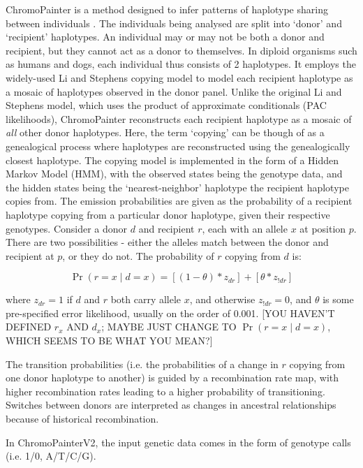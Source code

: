 ChromoPainter is a method designed to infer patterns of haplotype sharing between individuals \cite{Lawson2012}. The individuals being analysed are split into `donor' and `recipient' haplotypes. An individual may or may not be both a donor and recipient, but they cannot act as a donor to themselves. In diploid organisms such as humans and dogs, each individual thus consists of 2 haplotypes. It employs the widely-used Li and Stephens copying model \cite{Li2003} to model each recipient haplotype as a mosaic of haplotypes observed in the donor panel. Unlike the original Li and Stephens model, which uses the product of approximate conditionals (PAC likelihoods), ChromoPainter reconstructs each recipient haplotype as a mosaic of \textit{all} other donor haplotypes. Here, the term `copying' can be though of as a genealogical process where haplotypes are reconstructed using the genealogically closest haplotype. The copying model is implemented in the form of a Hidden Markov Model (HMM), with the observed states being the genotype data, and the hidden states being the `nearest-neighbor' haplotype the recipient haplotype copies from. The emission probabilities are given as the probability of a recipient haplotype copying from a particular donor haplotype, given their respective genotypes. Consider a donor $d$ and recipient $r$, each with an allele $x$ at position $p$. There are two possibilities - either the alleles match between the donor and recipient at $p$, or they do not. The probability of $r$ copying from $d$ is: 

\begin{equation}
\Pr(r = x \mid d = x) = [(1-\theta) * z_{dr}] + [\theta * z_{!dr}] 
\end{equation}

where $z_{dr} = 1$ if $d$ and $r$ both carry allele $x$, and otherwise $z_{!dr} = 0$, and $\theta$ is some pre-specified error likelihood, usually on the order of 0.001. {\color{red}[YOU HAVEN'T DEFINED $r_x$ AND $d_x$; MAYBE JUST CHANGE TO $\Pr(r = x \mid d = x)$, WHICH SEEMS TO BE WHAT YOU MEAN?]}

The transition probabilities (i.e. the probabilities of a change in $r$ copying from one donor haplotype to another) is guided by a recombination rate map, with higher recombination rates leading to a higher probability of transitioning. Switches between donors are interpreted as changes in ancestral relationships because of historical recombination.

In ChromoPainterV2, the input genetic data comes in the form of genotype calls (i.e. 1/0, A/T/C/G).

